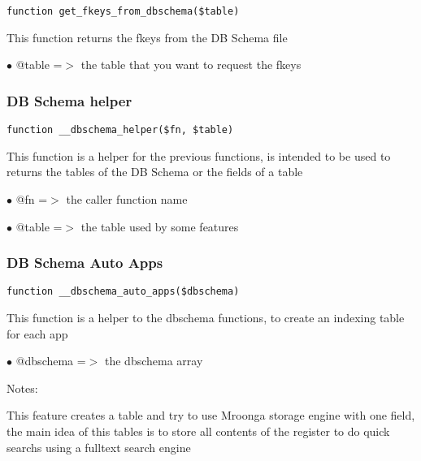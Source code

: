 \documentclass[a4paper]{article}
\begin{document}
\begin{lstlisting}
function get_fkeys_from_dbschema($table)
\end{lstlisting}

This function returns the fkeys from the DB Schema file

\begin{compactitem}
\item[\color{myblue}$\bullet$] @table =$>$ the table that you want to request the fkeys
\end{compactitem}

\hypertarget{toc421}{}
\subsubsection{DB Schema helper}

\begin{lstlisting}
function __dbschema_helper($fn, $table)
\end{lstlisting}

This function is a helper for the previous functions, is intended to be used
to returns the tables of the DB Schema or the fields of a table

\begin{compactitem}
\item[\color{myblue}$\bullet$] @fn    =$>$ the caller function name
\item[\color{myblue}$\bullet$] @table =$>$ the table used by some features
\end{compactitem}

\hypertarget{toc422}{}
\subsubsection{DB Schema Auto Apps}

\begin{lstlisting}
function __dbschema_auto_apps($dbschema)
\end{lstlisting}

This function is a helper to the dbschema functions, to create an indexing table for each app

\begin{compactitem}
\item[\color{myblue}$\bullet$] @dbschema =$>$ the dbschema array
\end{compactitem}

Notes:

This feature creates a table and try to use Mroonga storage engine with one field, the main
idea of this tables is to store all contents of the register to do quick searchs using a
fulltext search engine
\end{document}
